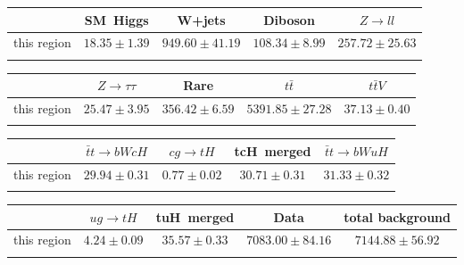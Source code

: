 \centering
\begin{tabular}{ccccc} \toprule\toprule
 & SM~Higgs & W+jets & Diboson & $Z\to ll$\\\midrule
this region & $18.35\pm1.39$ & $949.60\pm41.19$ & $108.34\pm8.99$ & $257.72\pm25.63$\\
\bottomrule\bottomrule\\
\end{tabular}
\begin{tabular}{ccccc} \toprule\toprule
 & $Z\to \tau\tau$ & Rare & $t\bar{t}$ & $t\bar{t}V$\\\midrule
this region & $25.47\pm3.95$ & $356.42\pm6.59$ & $5391.85\pm27.28$ & $37.13\pm0.40$\\
\bottomrule\bottomrule\\
\end{tabular}
\begin{tabular}{ccccc} \toprule\toprule
 & $\bar{t}t\to bWcH$ & $cg\to tH$ & tcH~merged & $\bar{t}t\to bWuH$\\\midrule
this region & $29.94\pm0.31$ & $0.77\pm0.02$ & $30.71\pm0.31$ & $31.33\pm0.32$\\
\bottomrule\bottomrule\\
\end{tabular}
\begin{tabular}{ccccc} \toprule\toprule
 & $ug\to tH$ & tuH~merged & Data & total background\\\midrule
this region & $4.24\pm0.09$ & $35.57\pm0.33$ & $7083.00\pm84.16$ & $7144.88\pm56.92$\\
\bottomrule\bottomrule\\
\end{tabular}
